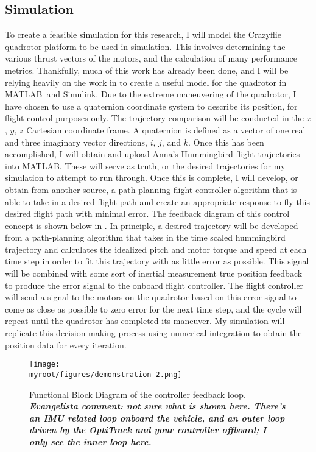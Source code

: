 \documentclass[onecolumn,10pt]{IEEEtran}
\newcommand{\myroot}{../}
\newcommand{\MATLAB}{MATLAB}
\begin{document}
\subsection{Simulation}
To create a feasible simulation for this research, I will model the Crazyflie quadrotor platform to be used in simulation. This involves determining the various thrust vectors of the motors, and the calculation of many performance metrics. Thankfully, much of this work has already been done, and I will be relying heavily on the work in \cite{cheng2016flight} to create a useful model for the quadrotor in \MATLAB\ and Simulink. Due to the extreme maneuvering of the quadrotor, I have chosen to use a quaternion coordinate system to describe its position, for flight control purposes only. The trajectory comparison will be conducted in the $x$, $y$, $z$ Cartesian coordinate frame. A quaternion is defined as a vector of one real and three imaginary vector directions, $i$, $j$, and $k$. Once this has been accomplished, I will obtain and upload Anna’s Hummingbird flight trajectories into \MATLAB. These will serve as truth, or the desired trajectories for my simulation to attempt to run through. Once this is complete, I will develop, or obtain from another source, a path-planning flight controller algorithm that is able to take in a desired flight path and create an appropriate response to fly this desired flight path with minimal error. The feedback diagram of this control concept is shown below in . In principle, a desired trajectory will be developed from a path-planning algorithm that takes in the time scaled hummingbird trajectory and calculates the idealized pitch and motor torque and speed at each time step in order to fit this trajectory with as little error as possible. This signal will be combined with some sort of inertial measurement true position feedback to produce the error signal to the onboard flight controller. The flight controller will send a signal to the motors on the quadrotor based on this error signal to come as close as possible to zero error for the next time step, and the cycle will repeat until the quadrotor has completed its maneuver. My simulation will replicate this decision-making process using numerical integration to obtain the position data for every iteration.
\begin{figure}
\begin{center}
\texttt{[image: \\myroot/figures/demonstration-2.png]}
\end{center}
\caption{Functional Block Diagram of the controller feedback loop. \emph{\textbf{Evangelista comment: not sure what is shown here. There's an IMU related loop onboard the vehicle, and an outer loop driven by the OptiTrack and your controller offboard; I only see the inner loop here.}}}
\label{fig:demonstration-2}
\end{figure}
\end{document}
